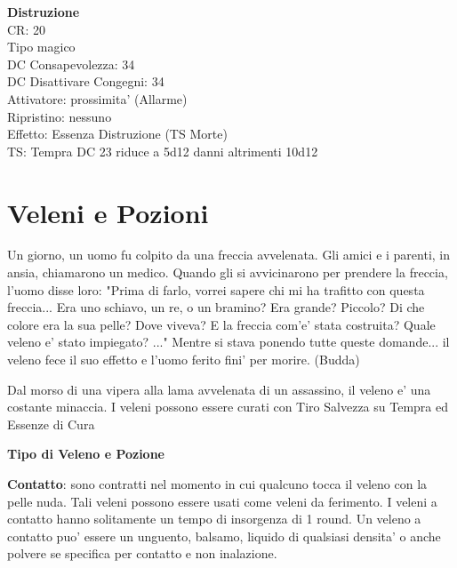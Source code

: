 \documentclass[a4paper,11pt,twoside,openany]{dndbook}
\begin{document}
{\begin{multicols}{2}
\textbf{Distruzione}\\
CR: 20 \\
Tipo magico \\
DC Consapevolezza: 34 \\
DC Disattivare Congegni: 34 \\
Attivatore: prossimita' (Allarme) \\
Ripristino: nessuno \\
Effetto: Essenza Distruzione (TS Morte)\\
TS: Tempra DC 23 riduce a 5d12 danni altrimenti 10d12\\

\end{multicols}

\pagebreak


\section{Veleni e Pozioni}

\label{veleni-e-pozioni}


\begin{quotebox}
Un giorno, un uomo fu colpito da una freccia avvelenata. Gli amici e i parenti, in ansia, chiamarono un medico. Quando gli si avvicinarono per prendere la freccia, l'uomo disse loro: "Prima di farlo, vorrei sapere chi mi ha trafitto con questa freccia... Era uno schiavo, un re, o un bramino? Era grande? Piccolo? Di che colore era la sua pelle? Dove viveva? E la freccia com'e' stata costruita? Quale veleno e' stato impiegato? ..." Mentre si stava ponendo tutte queste domande... il veleno fece il suo effetto e l'uomo ferito fini' per morire. (Budda)
\end{quotebox}


Dal morso di una vipera alla lama avvelenata di un assassino, il veleno e' una costante minaccia. I veleni possono essere curati con Tiro Salvezza su Tempra ed Essenze di Cura

\bigskip

\textbf{Tipo di Veleno e Pozione}

\textbf{Contatto}: sono contratti nel momento in cui qualcuno tocca il veleno con la pelle nuda. Tali veleni possono essere usati come veleni da ferimento. I veleni a contatto hanno solitamente un tempo di insorgenza di 1 round. Un veleno a contatto puo' essere un unguento, balsamo, liquido di qualsiasi densita' o anche polvere se specifica per contatto e non inalazione.

}
\end{document}
